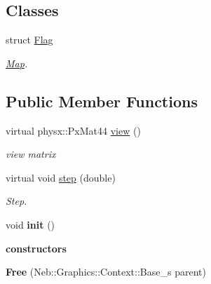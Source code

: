 \subsection*{\-Classes}
\begin{DoxyCompactItemize}
\item 
struct \hyperlink{structNeb_1_1Graphics_1_1Camera_1_1View_1_1Free_1_1Flag}{\-Flag}
\begin{DoxyCompactList}\small\item\em \hyperlink{classNeb_1_1Map}{\-Map}. \end{DoxyCompactList}\end{DoxyCompactItemize}
\subsection*{\-Public \-Member \-Functions}
\begin{DoxyCompactItemize}
\item 
\hypertarget{classNeb_1_1Graphics_1_1Camera_1_1View_1_1Free_a4029cc5e1912c93d1d0d82ca6ed7c125}{virtual physx\-::\-Px\-Mat44 \hyperlink{classNeb_1_1Graphics_1_1Camera_1_1View_1_1Free_a4029cc5e1912c93d1d0d82ca6ed7c125}{view} ()}\label{classNeb_1_1Graphics_1_1Camera_1_1View_1_1Free_a4029cc5e1912c93d1d0d82ca6ed7c125}

\begin{DoxyCompactList}\small\item\em view matrix \end{DoxyCompactList}\item 
virtual void \hyperlink{classNeb_1_1Graphics_1_1Camera_1_1View_1_1Free_a735e8aa6d1a5d9bfd925fc6a4192b3ba}{step} (double)
\begin{DoxyCompactList}\small\item\em \-Step. \end{DoxyCompactList}\item 
\hypertarget{classNeb_1_1Graphics_1_1Camera_1_1View_1_1Free_a0123e8820b5df74c2c98067f0308e3c5}{void {\bfseries init} ()}\label{classNeb_1_1Graphics_1_1Camera_1_1View_1_1Free_a0123e8820b5df74c2c98067f0308e3c5}

\end{DoxyCompactItemize}
\begin{Indent}{\bf constructors}\par
\begin{DoxyCompactItemize}
\item 
\hypertarget{classNeb_1_1Graphics_1_1Camera_1_1View_1_1Free_a2c54b77bc158e4a4de8cdc65ea9c8039}{{\bfseries \-Free} (\-Neb\-::\-Graphics\-::\-Context\-::\-Base\-\_\-s parent)}\label{classNeb_1_1Graphics_1_1Camera_1_1View_1_1Free_a2c54b77bc158e4a4de8cdc65ea9c8039}

\end{DoxyCompactItemize}
\end{Indent}
